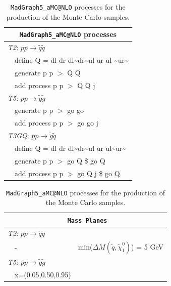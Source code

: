 \documentclass[a4paper,11pt]{article}
\newcommand{\TGQ}{ \textit{T3GQ}}
\newcommand{\Ttwo}{ \textit{T2}}
\newcommand{\Tfive}{ \textit{T5}}
\begin{document}
\begin{table}
	\small
	\renewcommand{\arraystretch}{1.0}
	\begin{tabular}{ l l }  \toprule  \toprule 
		\multicolumn{2}{c}{\texttt{MadGraph5\_aMC@NLO} processes} \\ \toprule \toprule
		\multicolumn{2}{l}{\Ttwo: $p p \rightarrow \tilde q \tilde q$}  \\
		& define Q = dl dr dl\textasciitilde dr\textasciitilde ul ur ul \textasciitilde ur\textasciitilde \\
		& generate p p $>$ Q Q  \\
		&  add process p p $>$ Q Q j \\  \toprule 
		\multicolumn{2}{l}{\Tfive: $p p \rightarrow \tilde g \tilde g$ } \\ 
		& generate p p $>$ go go \\
		&  add process p p $>$ go go j \\ \toprule 
		\multicolumn{2}{l}{\TGQ: $p p \rightarrow \tilde g \tilde q$} \\  
		&  define Q = dl dr dl\textasciitilde dr\textasciitilde ul ur ul\textasciitilde ur\textasciitilde \\
		&  generate p p $>$ go Q \$ go Q \\
		&  add process p p $>$ go Q j \$ go Q \\  \bottomrule \bottomrule 
	\end{tabular}
	\normalsize
	\caption{\texttt{MadGraph5\_aMC@NLO} processes for the production of the Monte Carlo samples.}
	\label{mg5_processes}
	\footnotesize
	\small
	\renewcommand{\arraystretch}{1.0}
	\begin{tabular}{ l l l }  \toprule \toprule 
		\multicolumn{3}{c}{\texttt{ \normalsize \textbf{Mass Planes}}} \\ \toprule \toprule
		\multicolumn{3}{l}{\Ttwo: $p p \rightarrow \tilde q \tilde q$} \\
		& - & min($\Delta M(\tilde q, \tilde \chi _1 ^0)$) = 5 GeV \\ \midrule
		\multicolumn{3}{l}{\Tfive: $p p \rightarrow \tilde g \tilde g$} \\ 
		&x=(0.05,0.50,0.95) &  \\ 

\end{tabular}
\end{table}
\end{document}
